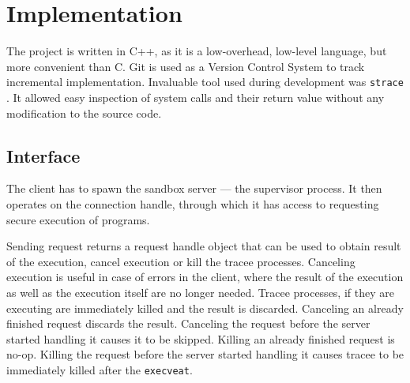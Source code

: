 \documentclass[en]{pracamgr}
\begin{document}
\chapter{Implementation}\label{chapter:implementation}

The project is written in C++, as it is a low-overhead, low-level language, but more convenient than C. Git is used as a Version Control System to track incremental implementation. Invaluable tool used during development was \texttt{strace} \cite{strace}. It allowed easy inspection of system calls and their return value without any modification to the source code.

\section{Interface}

The client has to spawn the sandbox server --- the supervisor process. It then operates on the connection handle, through which it has access to requesting secure execution of programs.

Sending request returns a request handle object that can be used to obtain result of the execution, cancel execution or kill the tracee processes. Canceling execution is useful in case of errors in the client, where the result of the execution as well as the execution itself are no longer needed. Tracee processes, if they are executing are immediately killed and the result is discarded. Canceling an already finished request discards the result. Canceling the request before the server started handling it causes it to be skipped. Killing an already finished request is no-op. Killing the request before the server started handling it causes tracee to be immediately killed after the \texttt{execveat}.
\end{document}
